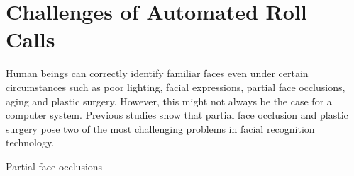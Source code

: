 \section{Challenges of Automated Roll Calls}
Human beings can correctly identify familiar faces even under certain circumstances such as poor lighting,
facial expressions, partial face occlusions, aging and plastic surgery. However, this might not always be the case
for a computer system. Previous studies show that partial face occlusion and plastic surgery pose two of the most
challenging problems in facial recognition technology.

Partial face occlusions 
